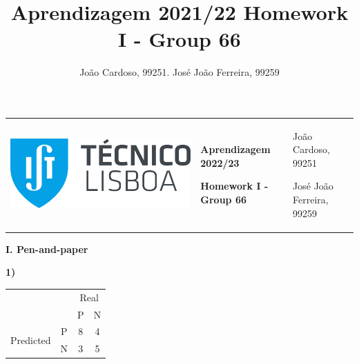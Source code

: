 \documentclass[11pt,a4paper]{article}
\title{Aprendizagem 2021/22 Homework I - Group 66}
\author{João Cardoso, 99251. José João Ferreira, 99259}
\begin{document}
\color{darkgray}
\hspace{-8.25mm}
\begin{tabularx}{1.09\textwidth} {>{\raggedright\arraybackslash}X >{\centering\arraybackslash}X >{\raggedleft\arraybackslash}X}
  \includegraphics[scale=0.2]{tecnico.pdf}                          &
  \textbf{Aprendizagem 2022/23} \par \textbf{Homework I - Group 66} &
  João Cardoso, 99251 \par José João Ferreira, 99259
\end{tabularx}
\color{black}

\begin{center}
  \textbf{I. Pen-and-paper}
\end{center}

\begin{flushleft}
  \textbf{1)}
  \small
  \begin{tabular}{llcc}
                                                    &                        & \multicolumn{2}{c}{Real}                          \\ \cline{3-4}
                                                    & \multicolumn{1}{l|}{}  & \multicolumn{1}{c|}{P}   & \multicolumn{1}{c|}{N} \\ \cline{2-4}
    \multicolumn{1}{c|}{\multirow{2}{*}{Predicted}} & \multicolumn{1}{c|}{P} & \multicolumn{1}{c|}{8}   & \multicolumn{1}{c|}{4} \\ \cline{2-4}
    \multicolumn{1}{c|}{}                           & \multicolumn{1}{c|}{N} & \multicolumn{1}{c|}{3}   & \multicolumn{1}{c|}{5} \\ \cline{2-4}
  \end{tabular}

  \normalsize
\end{flushleft}
\end{document}

